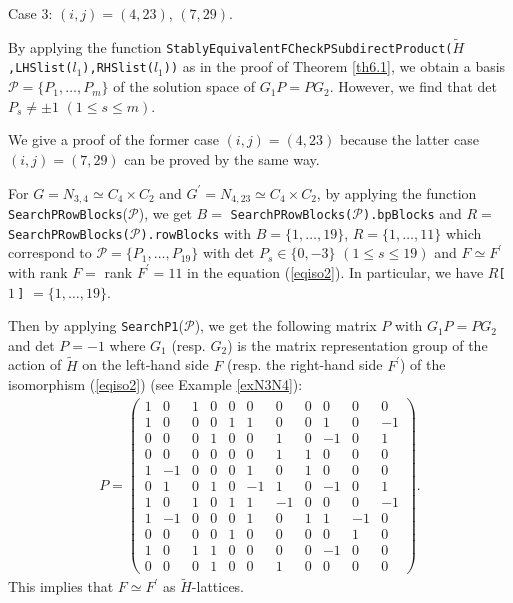 \documentclass{amsart}
\theoremstyle{plain}
\theoremstyle{definition}
\theoremstyle{remark}
\begin{document}
Case 3: $(i,j)=(4,23)$, $(7,29)$. 

By applying the function 
{\tt StablyEquivalentFCheckPSubdirectProduct($\widetilde{H}$,LHSlist($l_1$),RHSlist($l_1$))} as in the proof of Theorem \ref{th6.1}, 
we obtain a basis 
$\mathcal{P}=\{P_1,\dots,P_m\}$ of the solution space of $G_1P=PG_2$. 
However, we find that det $P_s\neq \pm 1$ $(1\leq s\leq m)$. 

We give a proof of the former case $(i,j)=(4,23)$ 
because the latter case $(i,j)=(7,29)$ can be proved by the same way. 

For $G=N_{3,4}\simeq C_4\times C_2$ and 
$G^\prime=N_{4,23}\simeq C_4\times C_2$, 
by applying the function {\tt SearchPRowBlocks}($\mathcal{P}$), 
we get 
$B=$ {\tt SearchPRowBlocks($\mathcal{P}$).bpBlocks} 
and 
$R=$ {\tt SearchPRowBlocks($\mathcal{P}$).rowBlocks} 
with $B=\{1,\ldots,19\}$, 
$R=\{1,\ldots,11\}$
which correspond to 
$\mathcal{P}=\{P_1,\ldots,P_{19}\}$ 
with det $P_s\in\{0,-3\}$ $(1\leq s\leq 19)$ 
and $F\simeq F^\prime$
with rank $F=$ rank $F^\prime=11$ 
in the equation (\ref{eqiso2}). 
In particular, we have 
$R${\tt [}\,$1$\,{\tt ]} $=\{1,\ldots,19\}$. 

Then by applying 
{\tt SearchP1}($\mathcal{P}$), 
we get the following matrix $P$ with $G_1P=PG_2$ and det $P=-1$ 
where $G_1$ (resp. $G_2$) 
is the matrix representation group of the action of 
$\widetilde{H}$ on the left-hand side $F$ 
(resp. the right-hand side $F^\prime$) of the isomorphism (\ref{eqiso2}) 
(see Example \ref{exN3N4}): 
\begin{align*}
P=\left(\begin{array}{ccccccccccc}
1&0&1&0&0&0&0&0&0&0&0\\
1&0&0&0&1&1&0&0&1&0&-1\\
0&0&0&1&0&0&1&0&-1&0&1\\
0&0&0&0&0&0&1&1&0&0&0\\
1&-1&0&0&0&1&0&1&0&0&0\\
0&1&0&1&0&-1&1&0&-1&0&1\\
1&0&1&0&1&1&-1&0&0&0&-1\\
1&-1&0&0&0&1&0&1&1&-1&0\\
0&0&0&0&1&0&0&0&0&1&0\\
1&0&1&1&0&0&0&0&-1&0&0\\
0&0&0&1&0&0&1&0&0&0&0
\end{array}\right).
\end{align*}
This implies that $F\simeq F^\prime$ 
as $\widetilde{H}$-lattices.\\ 
\end{document}

